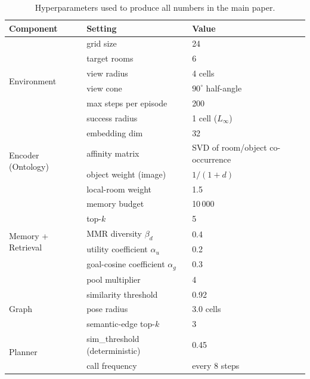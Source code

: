 \documentclass[conference,a4paper,10pt]{IEEEtran}
\begin{document}
\begin{table}[h]
\centering
\caption{Hyperparameters used to produce all numbers in the main paper.}
\label{tab:hyperparams}
\small
\begin{tabular}{lll}
\toprule
\textbf{Component} & \textbf{Setting} & \textbf{Value} \\
\midrule
\multirow{6}{*}{Environment} & grid size & 24 \\
                              & target rooms & 6 \\
                              & view radius & 4 cells \\
                              & view cone & $90^\circ$ half-angle \\
                              & max steps per episode & 200 \\
                              & success radius & 1 cell ($L_\infty$) \\
\midrule
\multirow{4}{*}{Encoder (Ontology)} & embedding dim & 32 \\
                                     & affinity matrix & SVD of room/object co-occurrence \\
                                     & object weight (image) & $1/(1+d)$ \\
                                     & local-room weight & 1.5 \\
\midrule
\multirow{6}{*}{Memory + Retrieval} & memory budget & 10\,000 \\
                                     & top-$k$ & 5 \\
                                     & MMR diversity $\beta_d$ & 0.4 \\
                                     & utility coefficient $\alpha_u$ & 0.2 \\
                                     & goal-cosine coefficient $\alpha_g$ & 0.3 \\
                                     & pool multiplier & 4 \\
\midrule
\multirow{3}{*}{Graph} & similarity threshold & 0.92 \\
                        & pose radius & 3.0 cells \\
                        & semantic-edge top-$k$ & 3 \\
\midrule
\multirow{2}{*}{Planner} & sim\_threshold (deterministic) & 0.45 \\
                          & call frequency & every 8 steps \\
\midrule

\end{tabular}
\end{table}
\end{document}
